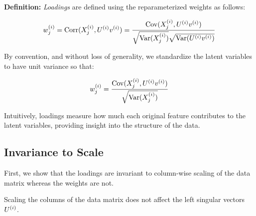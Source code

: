 \textbf{Definition:} \textit{Loadings} are defined using the reparameterized weights as follows:

\begin{align}
    w^{(i)}_j = \operatorname{Corr}(X^{(i)}_j, U^{(i)}v^{(i)}) = \frac{\mathrm{Cov}(X^{(i)}_j, U^{(i)}v^{(i)})}{\sqrt{\mathrm{Var}(X^{(i)}_j)}\sqrt{\mathrm{Var}(U^{(i)}v^{(i)})}} \label{eq:loading_def}
\end{align}

By convention, and without loss of generality, we standardize the latent variables to have unit variance so that:

\begin{align}
    w^{(i)}_j = \frac{\mathrm{Cov}(X^{(i)}_j, U^{(i)}v^{(i)})}{\sqrt{\mathrm{Var}(X^{(i)}_j)}} \label{eq:standardized_loading}
\end{align}

Intuitively, \gls{loadings} measure how much each original feature contributes to the latent variables, providing insight into the structure of the data.

\subsection{Invariance to Scale}\label{subsubsec:invariance-to-scale}

First, we show that the \gls{loadings} are invariant to column-wise scaling of the data matrix whereas the weights are not.

\begin{lemma}
    Scaling the columns of the data matrix does not affect the left singular vectors $U^{(i)}$.
\end{lemma}

